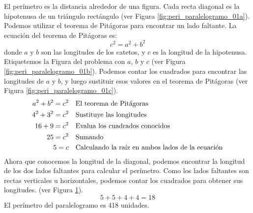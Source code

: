 \begin{solutionbox}{16cm}
\begin{minipage}{0.4\textwidth}
\begin{multicols}{2}
\begin{figure}[H]
                \caption{}
                \label{fig:peri_paralelogramo_01d}
            \end{figure}
        \end{multicols}
    \end{minipage}\hfill
    \begin{minipage}{0.55\textwidth}
        El perímetro es la distancia alrededor de una figura.
        Cada recta diagonal es la hipotenusa de un triángulo rectángulo (ver Figura \ref{fig:peri_paralelogramo_01a}).
        Podemos utilizar el teorema de Pitágoras para encontrar un lado faltante.
        La ecuación del teorema de Pitágoras es:
        \[c^2=a^2+b^2\]
        donde $a$ y $b$ son las longitudes de los catetos, y $c$ es la longitud de la hipotenusa.
        Etiquetemos la Figura del problema con $a$, $b$ y $c$ (ver Figura \ref{fig:peri_paralelogramo_01b}).
        Podemos contar los cuadrados para encontrar las longitudes de $a$ y $b$, y luego sustituir esos valores en el teorema de Pitágoras (ver Figura \ref{fig:peri_paralelogramo_01c}).
        \begin{align*}
            a^2+b^2  =c^2 & \text{\quad El teorema de Pitágoras}                          \\
            4^2+3^2  =c^2 & \text{\quad Sustituye las longitudes}                         \\
            16 +9 =c^2    & \text{\quad Evalua los cuadrados conocidos}                   \\
            25=c^2        & \text{\quad Sumando }                                         \\
            5=c           & \text{\quad Calculando la raíz en ambos lados de la ecuación} \\
        \end{align*}
        Ahora que conocemos la longitud de la diagonal, podemos encontrar la longitud de los dos lados faltantes para calcular el perímetro.
        Como los lados faltantes son rectas verticales u horizontales, podemos contar los cuadrados para obtener sus longitudes. (ver Figura \ref{fig:peri_paralelogramo_01d}).
        \[5+5+4+4=18\]
        El perímetro del paralelogramo es 418 unidades.
    \end{minipage}
\end{solutionbox}
